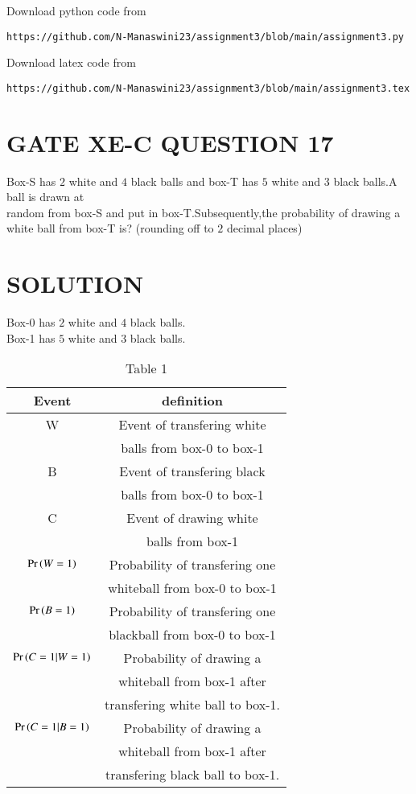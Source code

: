 \documentclass[journal,12pt,twocolumn]{IEEEtran}
\begin{document}
\renewcommand{\thefigure}{\theenumi}
\renewcommand{\thetable}{\theenumi}
Download python code from 
\begin{lstlisting}
https://github.com/N-Manaswini23/assignment3/blob/main/assignment3.py
\end{lstlisting}
%
Download latex code from 
\begin{lstlisting}
https://github.com/N-Manaswini23/assignment3/blob/main/assignment3.tex
\end{lstlisting}
%

\section*{GATE XE-C QUESTION 17}
Box-S has $2$ white and $4$ black balls and box-T has $5$ white and $3$ black balls.A ball is drawn at \\ random from box-S and put in box-T.Subsequently,the probability of drawing a white ball from box-T is? (rounding off to $ 2 $ decimal places)

\section*{SOLUTION}
Box-0 has $2$ white and $4$ black balls.\\
Box-1 has $5$ white and $3$ black balls.\\
\begin{table}[h!]
\resizebox{9cm}{!}
{ 
\begin{tabular}{|c|c|}
\hline
Event & definition \\
\hline
W & Event of transfering white\\
&  balls from box-0 to box-1\\
\hline
B & Event of transfering black \\
& balls from box-0 to box-1\\
\hline
C  & Event of drawing white\\
& balls from box-1 \\
\hline
$\Pr\left(W=1\right)$ & Probability of transfering one\\
&  whiteball  from box-0 to box-1 \\
\hline
$\Pr\left(B=1\right)$ &Probability of transfering one \\
& blackball from box-0 to box-1 \\
\hline
$\Pr\left(C=1|W=1\right)$ & Probability of drawing a\\
&  whiteball  from box-1 after\\
& transfering white ball to box-1.\\
\hline
$\Pr\left(C=1|B=1\right)$ & Probability of drawing a\\
&  whiteball from box-1 after\\
&  transfering  black ball to box-1.\\
\hline
\end{tabular}
}
\caption{Table 1} 
\label{tab:1}
\end{table}
\end{document}
